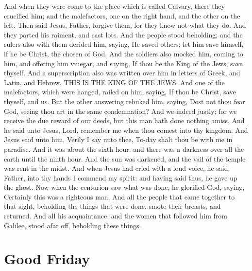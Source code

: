 And when they were come to the place which is called Calvary, there they crucified him; and the malefactors, one on the right hand, and the other on the left. Then said Jesus, Father, forgive them, for they know not what they do. And they parted his raiment, and cast lots. And the people stood beholding; and the rulers also with them derided him, saying, He saved others; let him save himself, if he be Christ, the chosen of God. And the soldiers also mocked him, coming to him, and offering him vinegar, and saying, If thou be the King of the Jews, save thyself. And a superscription also was written over him in letters of Greek, and Latin, and Hebrew, THIS IS THE KING OF THE JEWS. And one of the malefactors, which were hanged, railed on him, saying, If thou be Christ, save thyself, and us. But the other answering rebuked him, saying, Dost not thou fear God, seeing thou art in the same condemnation? And we indeed justly; for we receive the due reward of our deeds, but this man hath done nothing amiss. And he said unto Jesus, Lord, remember me when thou comest into thy kingdom. And Jesus said unto him, Verily I say unto thee, To-day shalt thou be with me in paradise. And it was about the sixth hour: and there was a darkness over all the earth until the ninth hour. And the sun was darkened, and the vail of the temple was rent in the midst. And when Jesus had cried with a loud voice, he said, Father, into thy hands I commend my spirit: and having said thus, he gave up the ghost. Now when the centurion saw what was done, he glorified God, saying, Certainly this was a righteous man. And all the people that came together to that sight, beholding the things that were done, smote their breasts, and returned. And all his acquaintance, and the women that followed him from Galilee, stood afar off, beholding these things.



\section{Good Friday}%



\subsection{}


